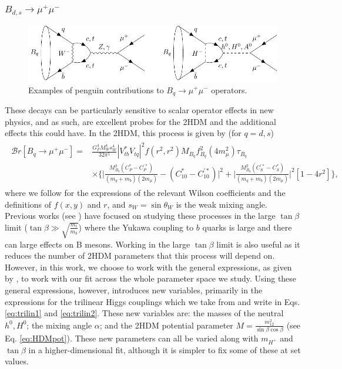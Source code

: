 \documentclass[a4paper,12pt]{article}
\begin{document}
\subsubsection{$B_{d,s}\to\mu^+\mu^-$}
\begin{figure}[ht]
    \centering
    \includegraphics[width=\textwidth]{bsmu.pdf}
    \caption{\label{fig:bspeng}Examples of penguin contributions to $B_q\to\mu^+\mu^-$ operators.}
\end{figure}
These decays can be particularly sensitive to scalar operator effects in new physics, and as such, are excellent probes for the 2HDM and the additional effects this could have. 
In the 2HDM, this process is given by (for $q=d,s$)
\begin{align}
    \begin{split}
        \mathcal{B}r[B_{q}\to\mu^+\mu^-] = &\frac{G^4_FM_W^4s_W^4}{32\pi^5}|V_{tb}^*V_{tq}|^2f(r^2,r^2)M_{B_q}f_{B_q}^2(4m_\mu^2)\tau_{B_q} \\
                                           &\times\Bigg\{\bigg|\frac{M_{B_q}^2(C_P^*-C_P^{'*})}{(m_q+m_b)(2m_\mu)}-(C_{10}^*-C_{10}^{'*})\bigg|^2 +\bigg|\frac{M_{B_q}^2(C_S^{'*}-C_S^*)}{(m_q+m_b)(2m_\mu)}\bigg|^2\left[1-4r^2\right]\Bigg\},
    \end{split}
\end{align}
where we follow \cite{criv} for the expressions of the relevant Wilson coefficients and the definitions of $f(x,y)$ and $r$, and $s_W=\sin\theta_W$ is the weak mixing angle. 
Previous works (see \cite{lrgtb}) have focused on studying these processes in the large $\tan\beta$ limit ($\tan\beta\gg\sqrt{\frac{m_t}{m_b}}$) where the Yukawa coupling to $b$ quarks is large and there can large effects on B mesons. 
Working in the large $\tan\beta$ limit is also useful as it reduces the number of 2HDM parameters that this process will depend on. 
However, in this work, we choose to work with the general expressions, as given by \cite{criv}, to work with our fit across the whole parameter space we study. 
Using these general expressions, however, introduces new variables, primarily in the expressions for the trilinear Higgs couplings which we take from \cite{trilin} and write in Eqs. \ref{eq:trilin1} and \ref{eq:trilin2}.
These new variables are: the masses of the neutral $h^0,H^0$; the mixing angle $\alpha$; and the 2HDM potential parameter $M=\frac{m_{12}^2}{\sin\beta\cos\beta}$ (see Eq. \ref{eq:HDMpot}). 
These new parameters can all be varied along with $m_{H^+}$ and $\tan\beta$ in a higher-dimensional fit, although it is simpler to fix some of these at set values. 
\end{document}
